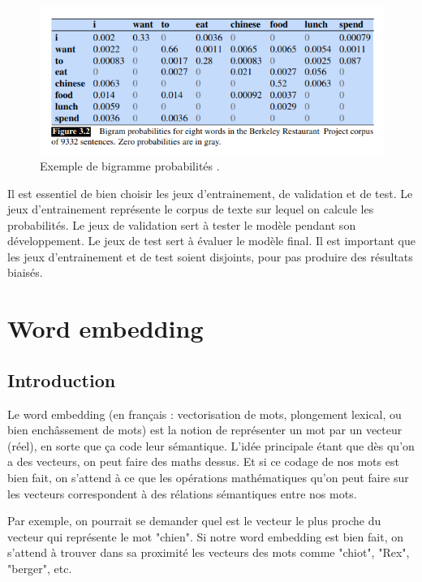 \documentclass[11pt, a4paper]{report}
\begin{document}
  \begin{figure}[t]
    \centering
    \includegraphics[width=1\textwidth]{bigram.png}
    \caption{Exemple de bigramme probabilités \cite[\textit{Speech and Language Processing}]{stanford-book-ngrams}.}
    \label{fig:pierce}
  \end{figure}

  Il est essentiel de bien choisir les jeux d'entrainement, de validation et de test. 
  Le jeux d'entrainement représente le corpus de texte sur lequel on calcule les 
  probabilités. Le jeux de validation sert à tester le modèle pendant son développement. 
  Le jeux de test sert à évaluer le modèle final. Il est important que les jeux 
  d'entrainement et de test soient disjoints, pour pas produire des résultats biaisés. 

\chapter{Word embedding}
  \section{Introduction}
  \cite{wikipedia-wembedding} \cite{wikipedia-wembedding-fr} Le word embedding (en français : vectorisation de mots, plongement lexical, ou bien enchâssement de mots)
est la notion de représenter un mot par un vecteur (réel), en sorte que ça code leur sémantique.
L'idée principale étant que dès qu'on a des vecteurs, on peut faire des maths dessus. Et si ce 
codage de nos mots est bien fait, on s'attend à ce que les opérations mathématiques qu'on peut 
faire sur les vecteurs correspondent à des rélations sémantiques entre nos mots. 

Par exemple, on pourrait se demander quel est le vecteur le plus proche du vecteur qui représente 
le mot "chien". Si notre word embedding est bien fait, on s'attend à trouver dans sa proximité 
les vecteurs des mots comme "chiot", "Rex", "berger", etc. 
\end{document}
